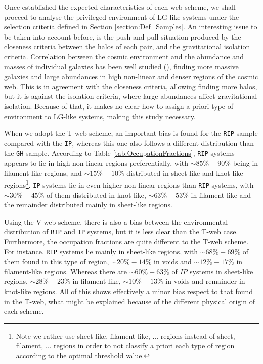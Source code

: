 \documentclass[usenatbib]{latex/mn2e}
\begin{document}
Once established the expected characteristics of each web scheme, we shall 
proceed to analyse the privileged environment of LG-like systems under the
selection criteria defined in Section \ref{section:Def_Samples}. An
interesting issue to be taken into account before, is the push and pull 
situation produced by the closeness criteria between the halos of each 
pair, and the gravitational isolation criteria. Correlation between the 
cosmic environment and the abundance and masses of individual galaxies has 
been well studied (), finding more massive 
galaxies and large abundances in high non-linear and denser regions of the 
cosmic web. This is in agreement with the closeness criteria, allowing 
finding more halos, but it is against the isolation criteria, where large 
abundances affect gravitational isolation. Because of that, it makes no 
clear how to assign a priori type of environment to LG-like systems, making 
this study necessary.



When we adopt the T-web scheme, an important bias is found for the 
\texttt{RIP} sample compared with the \texttt{IP}, whereas this one 
also follows a different distribution than the \texttt{GH} sample. 
According to Table \ref{tab:OccupationFractions}, \texttt{RIP} systems 
appears to lie in high non-linear regions preferentially, with $\sim 85\%-
90\%$ being in filament-like regions, and $\sim 15\%-10\%$ distributed in 
sheet-like and knot-like regions\footnote{Note we rather use sheet-like, 
filament-like, ... regions instead of sheet, filament, ... regions in 
order to not classify a priori each type of region according to the 
optimal threshold value.}. \texttt{IP} systems lie in even higher 
non-linear regions than \texttt{RIP} systems, with $\sim 30\% - 45\%$ of 
them distributed in knot-like, $\sim 63\% - 53\%$ in filament-like and the 
remainder distributed mainly in sheet-like regions.



Using the V-web scheme, there is also a bias between the environmental 
distribution of \texttt{RIP} and \texttt{IP} systems, but it is less clear
than the T-web case. Furthermore, the occupation fractions are quite 
different to the T-web scheme. For instance, \texttt{RIP} systems lie 
mainly in sheet-like regions, with $\sim 68\% - 69\%$ of them found in 
this type of region, $\sim 20\% - 14\%$ in voids and $\sim 12\% - 
17\%$ in filament-like regions. Whereas there are $\sim 60\% - 63\%$ of
\textit{IP} systems in sheet-like regions, $\sim 28\% - 23\%$ in 
filament-like, $\sim 10\% - 13\%$ in voids and remainder in knot-like
regions. All of this shows effectively a minor bias respect to that found
in the T-web, what might be explained because of the different physical 
origin of each scheme.
\end{document}
